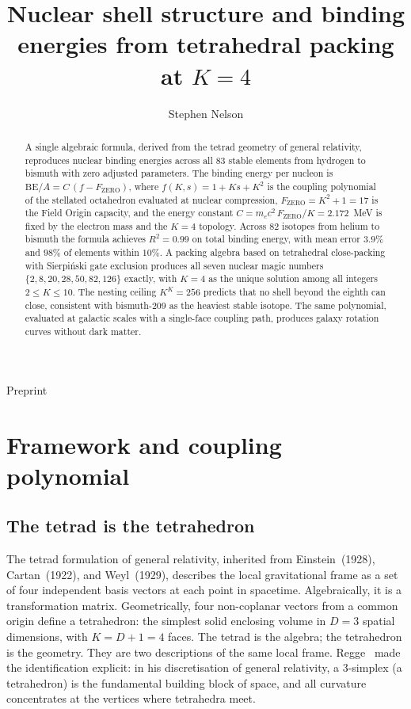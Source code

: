 \documentclass[twocolumn]{iopjournal}
\renewcommand{\articletype}[1]{%
  {\vspace*{-8mm}\noindent \Large \sf Preprint}\par
  \vspace*{6mm}\noindent{\scriptsize \sf{\bfseries \MakeUppercase{#1}}}}
\newcommand{\FZERO}{F_{\mathrm{ZERO}}}
\newcommand{\BEA}{\mathrm{BE}/A}
\begin{document}
\articletype{Letter}

\title{Nuclear shell structure and binding energies from tetrahedral packing at $K\!=\!4$}

\author{Stephen Nelson}


\begin{abstract}
A single algebraic formula, derived from the tetrad geometry of
general relativity, reproduces nuclear binding energies across all
83 stable elements from hydrogen to bismuth with zero adjusted
parameters.
The binding energy per nucleon is
$\BEA = C\,(f - \FZERO)$,
where $f(K,s) = 1 + Ks + K^2$ is the coupling polynomial of the
stellated octahedron evaluated at nuclear compression,
$\FZERO = K^2 + 1 = 17$ is the Field Origin capacity, and the
energy constant $C = m_e c^2\,\FZERO / K = 2.172$~MeV is fixed by
the electron mass and the $K = 4$ topology.
Across 82 isotopes from helium to bismuth the formula achieves
$R^2 = 0.99$ on total binding energy, with mean error $3.9\%$
and $98\%$ of elements within $10\%$.
A packing algebra based on tetrahedral close-packing
with Sierpi\'nski gate exclusion produces all seven nuclear magic
numbers $\{2, 8, 20, 28, 50, 82, 126\}$ exactly, with $K = 4$ as the
unique solution among all integers $2 \leq K \leq 10$.
The nesting ceiling $K^K = 256$ predicts that no shell beyond the
eighth can close, consistent with bismuth-209 as the heaviest
stable isotope.
The same polynomial, evaluated at galactic scales with a single-face
coupling path, produces galaxy rotation curves without dark matter.
\end{abstract}


\section{Framework and coupling polynomial}

\subsection*{The tetrad is the tetrahedron}

The tetrad formulation of general relativity,
inherited from Einstein~(1928), Cartan~(1922), and
Weyl~(1929), describes the local gravitational frame
as a set of four independent basis vectors at each point
in spacetime.
Algebraically, it is a transformation matrix.
Geometrically, four non-coplanar vectors from a common origin
define a tetrahedron: the simplest solid enclosing volume
in $D = 3$ spatial dimensions, with $K = D + 1 = 4$ faces.
The tetrad is the algebra; the tetrahedron is the geometry.
They are two descriptions of the same local frame.
Regge~\cite{regge1961} made the identification explicit:
in his discretisation of general relativity, a 3-simplex
(a tetrahedron) is the fundamental building block of space,
and all curvature concentrates at the vertices where
tetrahedra meet.
\end{document}

